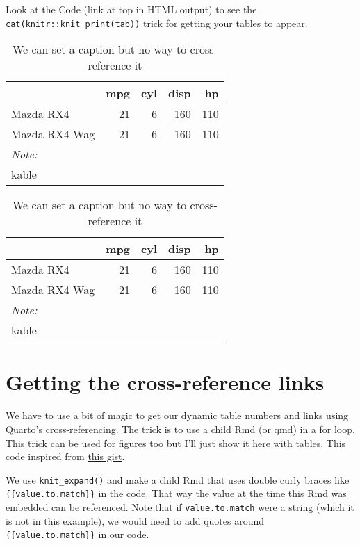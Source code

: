 \documentclass[
  letterpaper,
  oneside]{scrbook}
\begin{document}
Look at the Code (link at top in HTML output) to see the
\texttt{cat(knitr::knit\_print(tab))} trick for getting your tables to
appear.

\begin{table}

\caption{We can set a caption but no way to cross-reference it}
\centering
\begin{tabular}[t]{lrrrr}
\toprule
  & mpg & cyl & disp & hp\\
\midrule
Mazda RX4 & 21 & 6 & 160 & 110\\
Mazda RX4 Wag & 21 & 6 & 160 & 110\\
\bottomrule
\multicolumn{5}{l}{\rule{0pt}{1em}\textit{Note: }}\\
\multicolumn{5}{l}{\rule{0pt}{1em}kable}\\
\end{tabular}
\end{table}

\begin{table}

\caption{We can set a caption but no way to cross-reference it}
\centering
\begin{tabular}[t]{lrrrr}
\toprule
  & mpg & cyl & disp & hp\\
\midrule
Mazda RX4 & 21 & 6 & 160 & 110\\
Mazda RX4 Wag & 21 & 6 & 160 & 110\\
\bottomrule
\multicolumn{5}{l}{\rule{0pt}{1em}\textit{Note: }}\\
\multicolumn{5}{l}{\rule{0pt}{1em}kable}\\
\end{tabular}
\end{table}

\hypertarget{getting-the-cross-reference-links}{%
\section{Getting the cross-reference
links}\label{getting-the-cross-reference-links}}

We have to use a bit of magic to get our dynamic table numbers and links
using Quarto's cross-referencing. The trick is to use a child Rmd (or
qmd) in a for loop. This trick can be used for figures too but I'll just
show it here with tables. This code inspired from
\href{https://gist.github.com/rmoff/a043676a2f084b81a434}{this gist}.

We use \texttt{knit\_expand()} and make a child Rmd that uses double
curly braces like \texttt{\{\{value.to.match\}\}} in the code. That way
the value at the time this Rmd was embedded can be referenced. Note that
if \texttt{value.to.match} were a string (which it is not in this
example), we would need to add quotes around
\texttt{\{\{value.to.match\}\}} in our code.
\end{document}
